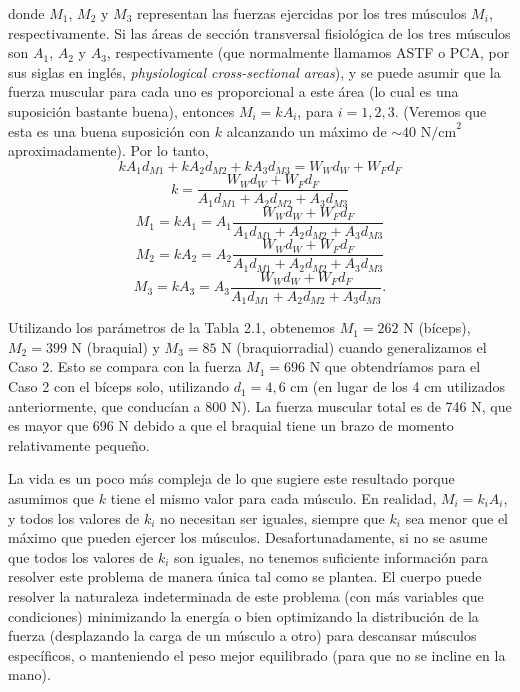 \documentclass[12pt]{book}
\begin{document}
donde $M_1$, $M_2$ y $M_3$ representan las fuerzas ejercidas por los tres músculos $M_i$, respectivamente. Si las áreas de sección transversal fisiológica de los tres músculos son $A_1$, $A_2$ y $A_3$, respectivamente (que normalmente llamamos ASTF o PCA, por sus siglas en inglés, \textit{physiological cross-sectional areas}), y se puede asumir que la fuerza muscular para cada uno es proporcional a este área (lo cual es una suposición bastante buena), entonces $M_i = k A_i$, para $i = 1, 2, 3$. (Veremos que esta es una buena suposición con $k$ alcanzando un máximo de $\sim 40\text{ N/cm}^2$ aproximadamente). Por lo tanto,
\begin{equation}
k A_1 d_{M1} + k A_2 d_{M2} + k A_3 d_{M3} = W_W d_W + W_F d_F
\label{eq:2.20}
\end{equation}
\begin{equation}
k = \frac{W_W d_W + W_F d_F}{A_1 d_{M1} + A_2 d_{M2} + A_3 d_{M3}}
\label{eq:2.21}
\end{equation}
\begin{equation}
M_1 = k A_1 = A_1 \frac{W_W d_W + W_F d_F}{A_1 d_{M1} + A_2 d_{M2} + A_3 d_{M3}}
\label{eq:2.22}
\end{equation}
\begin{equation}
M_2 = k A_2 = A_2 \frac{W_W d_W + W_F d_F}{A_1 d_{M1} + A_2 d_{M2} + A_3 d_{M3}}
\label{eq:2.23}
\end{equation}
\begin{equation}
M_3 = k A_3 = A_3 \frac{W_W d_W + W_F d_F}{A_1 d_{M1} + A_2 d_{M2} + A_3 d_{M3}}.
\label{eq:2.24}
\end{equation}

Utilizando los parámetros de la Tabla 2.1, obtenemos $M_1 = 262\text{ N}$ (bíceps), $M_2 = 399\text{ N}$ (braquial) y $M_3 = 85\text{ N}$ (braquiorradial) cuando generalizamos el Caso 2. Esto se compara con la fuerza $M_1 = 696\text{ N}$ que obtendríamos para el Caso 2 con el bíceps solo, utilizando $d_1 = 4,6$ cm (en lugar de los 4 cm utilizados anteriormente, que conducían a 800 N). La fuerza muscular total es de 746 N, que es mayor que 696 N debido a que el braquial tiene un brazo de momento relativamente pequeño.

La vida es un poco más compleja de lo que sugiere este resultado porque asumimos que $k$ tiene el mismo valor para cada músculo. En realidad, $M_i = k_i A_i$, y todos los valores de $k_i$ no necesitan ser iguales, siempre que $k_i$ sea menor que el máximo que pueden ejercer los músculos. Desafortunadamente, si no se asume que todos los valores de $k_i$ son iguales, no tenemos suficiente información para resolver este problema de manera única tal como se plantea. El cuerpo puede resolver la naturaleza indeterminada de este problema (con más variables que condiciones) minimizando la energía o bien optimizando la distribución de la fuerza (desplazando la carga de un músculo a otro) para descansar músculos específicos, o manteniendo el peso mejor equilibrado (para que no se incline en la mano).
\end{document}
